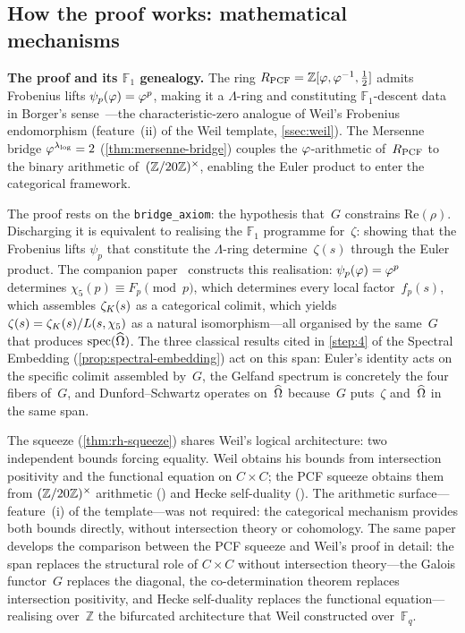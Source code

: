 \subsection{How the proof works: mathematical
mechanisms}\label{ssec:math-landscape}

\smallskip\noindent\textbf{The proof and its $\mathbb{F}_1$ genealogy.}
The ring $R_{\mathrm{PCF}} = \mathbb{Z}[\varphi,\varphi^{-1},\tfrac{1}{2}]$ admits
Frobenius lifts $\psi_p(\varphi) = \varphi^p$, making it a $\Lambda$-ring
and constituting $\mathbb{F}_1$-descent data in Borger's
sense~\cite{borger09}---the characteristic-zero analogue of Weil's
Frobenius endomorphism (feature~(ii) of the Weil template,
\cref{ssec:weil}).  The Mersenne bridge
$\varphi^{\lambda_{\log}} = 2$ (\cref{thm:mersenne-bridge}) couples
the $\varphi$-arithmetic of~$R_{\mathrm{PCF}}$ to the binary arithmetic
of~$(\mathbb{Z}/20\mathbb{Z})^\times$, enabling the Euler product to enter the categorical
framework.

The proof rests on the \texttt{bridge\_axiom}: the hypothesis
that~$G$ constrains $\mathrm{Re}(\rho)$.  Discharging it is
equivalent to realising the $\mathbb{F}_1$ programme for~$\zeta$:
showing that the Frobenius lifts $\psi_p$ that constitute the
$\Lambda$-ring determine~$\zeta(s)$ through the Euler product.
The companion paper~\cite{gonzalez26} constructs this realisation:
$\psi_p(\varphi)=\varphi^p$ determines $\chi_5(p)\equiv F_p\pmod{p}$,
which determines every local factor~$f_p(s)$, which assembles
$\zeta_K(s)$ as a categorical colimit, which yields
$\zeta(s)=\zeta_K(s)/L(s,\chi_5)$ as a natural isomorphism---all
organised by the same~$G$ that produces $\mathrm{spec}(\widehat{\Omega})$.
The three classical results cited in \cref{step:4} of the Spectral
Embedding (\cref{prop:spectral-embedding}) act on this span:
Euler's identity acts on the specific colimit assembled by~$G$,
the Gelfand spectrum is concretely the four fibers of~$G$, and
Dunford--Schwartz operates on~$\widehat{\Omega}$ because~$G$ puts~$\zeta$
and~$\widehat{\Omega}$ in the same span.

The squeeze (\cref{thm:rh-squeeze}) shares Weil's logical
architecture: two independent bounds forcing equality.  Weil obtains
his bounds from intersection positivity and the functional equation on
$C\times C$; the PCF squeeze obtains them from $(\mathbb{Z}/20\mathbb{Z})^\times$ arithmetic
() and Hecke self-duality
().  The arithmetic surface---feature~(i) of
the template---was not required: the categorical mechanism provides
both bounds directly, without intersection theory or cohomology.
The same paper develops the comparison between the PCF squeeze
and Weil's proof in detail: the span replaces the structural
role of $C\times C$ without intersection theory---the Galois
functor~$G$ replaces the diagonal, the co-determination theorem
replaces intersection positivity, and Hecke self-duality replaces
the functional equation---realising over~$\mathbb{Z}$ the
bifurcated architecture that Weil constructed
over~$\mathbb{F}_q$.

